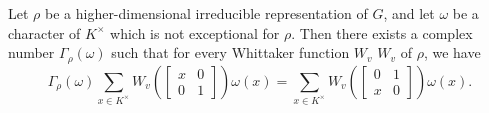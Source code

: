 \documentclass[../main.tex]{subfiles}
\begin{document}
\begin{theorem} \label{thm:def-gamma}
	Let $\rho$ be a higher-dimensional irreducible representation of $G$, and let $\omega$ be a character of $K^\times$ which is not exceptional for $\rho$. Then there exists a complex number $\Gamma_\rho(\omega)$ such that for every Whittaker function $W_v$ $W_v$ of $\rho$, we have
	\[\Gamma_\rho(\omega)\sum_{x\in K^\times}W_v\left(\begin{bmatrix}
		x & 0 \\
		0 & 1
	\end{bmatrix}\right)\omega(x)=\sum_{x\in K^\times}W_v\left(\begin{bmatrix}
		0 & 1 \\
		x & 0
	\end{bmatrix}\right)\omega(x).\]
\end{theorem}
\end{document}
